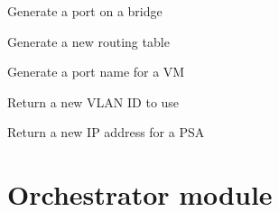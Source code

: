 \documentclass[letterpaper,10pt,oneside]{sphinxmanual}
\begin{document}
\begin{fulllineitems}
\begin{fulllineitems}
\label{Network:Network.Network.generatePort}
Generate a port on a bridge

\end{fulllineitems}


\begin{fulllineitems}
\label{Network:Network.Network.generateRoutingTable}
Generate a new routing table

\end{fulllineitems}


\begin{fulllineitems}
\label{Network:Network.Network.generateVMPort}
Generate a port name for a VM

\end{fulllineitems}


\begin{fulllineitems}
\label{Network:Network.Network.getNewVLANID}
Return a new VLAN ID to use

\end{fulllineitems}


\begin{fulllineitems}
\label{Network:Network.Network.getPSAnewAddress}
Return a new IP address for a PSA

\end{fulllineitems}


\end{fulllineitems}



\chapter{Orchestrator module}
\label{Orchestrator:orchestrator-module}\label{Orchestrator::doc}\label{Orchestrator:module-Orchestrator}
\end{document}
